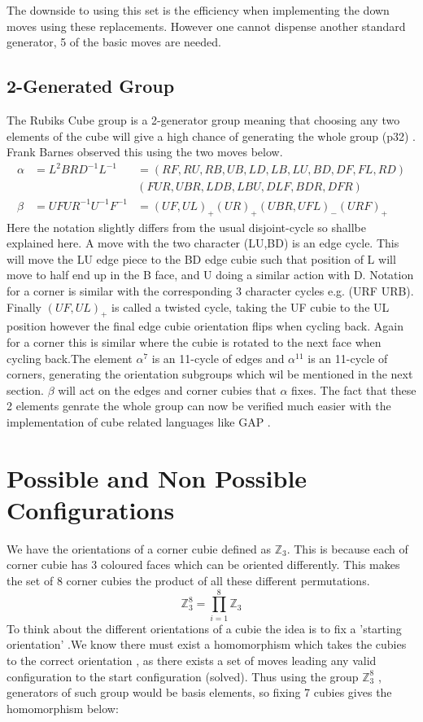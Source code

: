 \documentclass{article}
\newcounter{lem}[section]\setcounter{lem}{0}
\begin{document}
The downside to using this set is the efficiency when implementing the down moves using these replacements. However one cannot dispense another standard generator, 5 of the basic moves are needed.

\subsection{2-Generated Group}

The Rubiks Cube group is a 2-generator group meaning that choosing any two elements of the cube will give a high chance of generating the whole group (p32) \cite{Magic}. Frank Barnes observed this using the two moves below.
\begin{align*}
\alpha &= L^{2}BRD^{-1}L^{-1} &= (RF,RU,RB,UB,LD,LB,LU,BD,DF,FL,RD)\\& &(FUR,UBR,LDB,LBU,DLF,BDR,DFR) \\
\beta &= UFUR^{-1}U^{-1}F^{-1} &= (UF,UL)_{+}(UR)_{+}(UBR,UFL)_{-}(URF)_{+} 
\end{align*}
Here the notation slightly differs from the usual disjoint-cycle so shallbe explained here. A move with the two character (LU,BD) is an edge cycle. This will move the LU edge piece to the BD edge cubie such that position of L will move to half end up in the B face, and U doing a similar action with D. Notation for a corner is similar with the corresponding 3 character cycles e.g. (URF URB). Finally $(UF,UL)_{+}$ is called a twisted cycle, taking the UF cubie to the UL position however the final edge cubie orientation flips when cycling back. Again for a corner this is similar where the cubie is rotated to the next face when cycling back.\newline The element $\alpha^{7}$ is an 11-cycle of edges and $\alpha^{11}$ is an 11-cycle of corners, generating the orientation subgroups which wil be mentioned in the next section. $\beta$ will act on the edges and corner cubies that $\alpha$ fixes. The fact that these 2 elements genrate the whole group can now be verified much easier with the implementation of cube related languages like GAP \cite{GAP}.




\pagebreak
\section{Possible and Non Possible Configurations}


We have the orientations of a corner cubie defined as $\mathbb{Z}_3$.
This is because each of corner cubie has 3 coloured faces which can be oriented differently. 
This makes the set of 8 corner cubies the product of all these different permutations.\[\mathbb{Z}_{3}^8 = \prod_{i=1}^{8}\mathbb{Z}_{3}\]
To think about the different orientations of a cubie the idea is to fix a 'starting orientation' .We know there must exist a homomorphism which takes the cubies to the correct orientation , as there exists a set of moves leading any valid configuration to the start configuration (solved). Thus using the group $\mathbb{Z}_{3}^{8}$ , generators of such group would be basis elements,  so fixing 7 cubies gives the homomorphism below: 
\end{document}
